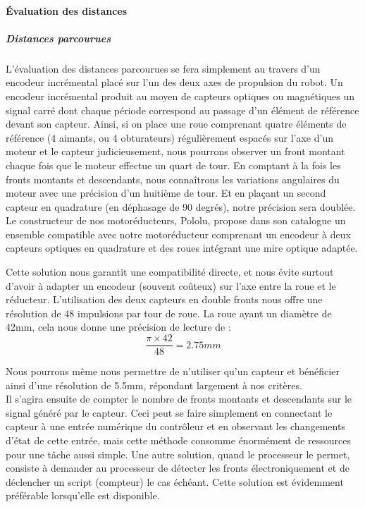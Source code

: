 		\paragraph{Évaluation des distances}

			\subparagraph*{Distances parcourues}

				L'évaluation des distances parcourues se fera simplement au travers d'un encodeur incrémental placé sur l'un des deux axes de propulsion du robot. Un encodeur incrémental produit au moyen de capteurs optiques ou magnétiques un signal carré dont chaque période correspond au passage d'un élément de référence devant son capteur.
				Ainsi, si on place une roue comprenant quatre éléments de référence (4 aimants, ou 4 obturateurs) régulièrement espacés sur l'axe d'un moteur et le capteur judicieusement, nous pourrons observer un front montant chaque fois que le moteur effectue un quart de tour. En comptant à la fois les fronts montants et descendants, nous connaîtrons les variations angulaires du moteur avec une précision d'un huitième de tour. Et en plaçant un second capteur en quadrature (en déphasage de 90 degrés), notre précision sera doublée.\\

				Le constructeur de nos motoréducteurs, Pololu, propose dans son catalogue un ensemble compatible avec notre motoréducteur comprenant un encodeur à deux capteurs optiques en quadrature et des roues intégrant une mire optique adaptée.


				Cette solution nous garantit une compatibilité directe, et nous évite surtout d'avoir à adapter un encodeur (souvent coûteux) sur l'axe entre la roue et le réducteur. L'utilisation des deux capteurs en double fronts nous offre une résolution de 48 impulsions par tour de roue. La roue ayant un diamètre de 42mm, cela nous donne une précision de lecture de :
				\[\frac{\pi \times 42}{48}=2.75mm\]

				Nous pourrons même nous permettre de n'utiliser qu'un capteur et bénéficier ainsi d'une résolution de 5.5mm, répondant largement à nos critères.\\

				Il s'agira ensuite de compter le nombre de fronts montants et descendants sur le signal généré par le capteur.
				Ceci peut se faire simplement en connectant le capteur à une entrée numérique du contrôleur et en observant les changements d'état de cette entrée, mais cette méthode consomme énormément de ressources pour une tâche aussi simple. Une autre solution, quand le processeur le permet, consiste à demander au processeur de détecter les fronts électroniquement et de déclencher un script (compteur) le cas échéant. Cette solution est évidemment préférable lorsqu'elle est disponible.\\

